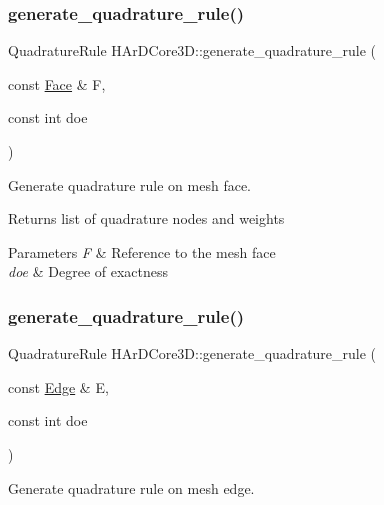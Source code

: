 \subsubsection{\texorpdfstring{generate\+\_\+quadrature\+\_\+rule()}{generate\_quadrature\_rule()}\hspace{0.1cm}{\footnotesize\ttfamily [2/3]}}
{\footnotesize\ttfamily Quadrature\+Rule H\+Ar\+D\+Core3\+D\+::generate\+\_\+quadrature\+\_\+rule (\begin{DoxyParamCaption}\item[{const \hyperlink{classHArDCore3D_1_1Face}{Face} \&}]{F,  }\item[{const int}]{doe }\end{DoxyParamCaption})}



Generate quadrature rule on mesh face. 

\begin{DoxyReturn}{Returns}
list of quadrature nodes and weights 
\end{DoxyReturn}

\begin{DoxyParams}{Parameters}
{\em F} & Reference to the mesh face \\
\hline
{\em doe} & Degree of exactness \\
\hline
\end{DoxyParams}
\mbox{\label{group__Quadratures_ga1516d2ddf96226cbcbacf93675e6678f}} 
\subsubsection{\texorpdfstring{generate\+\_\+quadrature\+\_\+rule()}{generate\_quadrature\_rule()}\hspace{0.1cm}{\footnotesize\ttfamily [3/3]}}
{\footnotesize\ttfamily Quadrature\+Rule H\+Ar\+D\+Core3\+D\+::generate\+\_\+quadrature\+\_\+rule (\begin{DoxyParamCaption}\item[{const \hyperlink{classHArDCore3D_1_1Edge}{Edge} \&}]{E,  }\item[{const int}]{doe }\end{DoxyParamCaption})}



Generate quadrature rule on mesh edge. 


